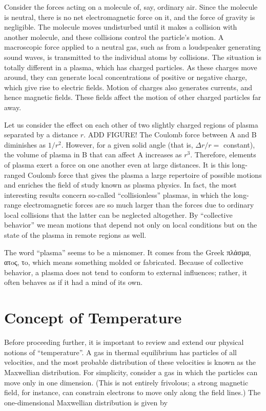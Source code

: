 \documentclass[
  notoc %
]{tufte-book}
\begin{document}
Consider the forces acting on a molecule of, say, ordinary air. Since
the molecule is neutral, there is no net electromagnetic force on it,
and the force of gravity is negligible. The molecule moves undisturbed
until it makes a collision with another molecule, and these collisions
control the particle's motion. A macroscopic force applied to a neutral
gas, such as from a loudspeaker generating sound waves, is transmitted
to the individual atoms by collisions. The situation is totally
different in a plasma, which has charged particles. As these charges
move around, they can generate local concentrations of positive or
negative charge, which give rise to electric fields. Motion of charges
also generates currents, and hence magnetic fields. These fields affect
the motion of other charged particles far away.

Let us consider the effect on each other of two slightly charged regions
of plasma separated by a distance \(r\). ADD FIGURE! The Coulomb force
between A and B diminishes as \(1/r^2\). However, for a given solid
angle (that is, \(\Delta r/r =\) constant), the volume of plasma in B
that can affect A increases as \(r^3\). Therefore, elements of plasma
exert a force on one another even at large distances. It is this
long-ranged Coulomb force that gives the plasma a large repertoire of
possible motions and enriches the field of study known as plasma
physics. In fact, the most interesting results concern so-called
``collisionless'' plasmas, in which the long-range electromagnetic
forces are so much larger than the forces due to ordinary local
collisions that the latter can be neglected altogether. By ``collective
behavior'' we mean motions that depend not only on local conditions but
on the state of the plasma in remote regions as well.

The word ``plasma'' seems to be a misnomer. It comes from the Greek
πλάσμα, ατoς, τo, which means something molded or fabricated. Because of
collective behavior, a plasma does not tend to conform to external
influences; rather, it often behaves as if it had a mind of its own.

\hypertarget{concept-of-temperature}{%
\section{Concept of Temperature}\label{concept-of-temperature}}

Before proceeding further, it is important to review and extend our
physical notions of ``temperature''. A gas in thermal equilibrium has
particles of all velocities, and the most probable distribution of these
velocities is known as the Maxwellian distribution. For simplicity,
consider a gas in which the particles can move only in one dimension.
(This is not entirely frivolous; a strong magnetic field, for instance,
can constrain electrons to move only along the field lines.) The
one-dimensional Maxwellian distribution is given by
\end{document}
